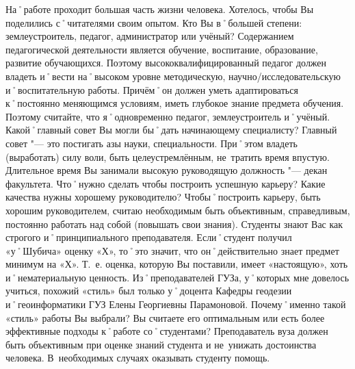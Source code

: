 \begin{drama}
	\maxspeaks На˚работе проходит большая часть жизни человека. Хотелось, чтобы Вы поделились с˚читателями своим опытом. Кто Вы в˚большей степени: землеустроитель, педагог, администратор или учёный?
	\michaelspeaks Содержанием педагогической деятельности является обучение, воспитание, образование, развитие обучающихся. Поэтому высококвалифицированный педагог должен владеть и˚вести на˚высоком уровне методическую, научно\-/исследовательскую и˚воспитательную работы. Причём˚он должен уметь адаптироваться к˚постоянно меняющимся условиям, иметь глубокое знание предмета обучения. Поэтому считайте, что я˚одновременно педагог, землеустроитель и˚учёный.
	\maxspeaks Какой˚главный совет Вы могли бы˚дать начинающему специалисту?
	\michaelspeaks Главный совет "--- это постигать азы науки, специальности. При˚этом владеть (выработать) силу воли, быть целеустремлённым, не~тратить время впустую.
	\maxspeaks Длительное время Вы занимали высокую руководящую должность "--- декан факультета. Что˚нужно сделать чтобы построить успешную карьеру? Какие качества нужны хорошему руководителю?
	\michaelspeaks Чтобы˚построить карьеру, быть хорошим руководителем, считаю необходимым быть объективным, справедливым, постоянно работать над собой (повышать свои знания).
	\maxspeaks Студенты знают Вас как строгого и˚принципиального преподавателя. Если˚студент получил  «у˚Шубича» оценку  «Х», то˚это значит, что он˚действительно знает предмет минимум на  «Х». Т.~е. оценка, которую Вы поставили, имеет  «настоящую», хоть и˚нематериальную ценность. Из˚преподавателей ГУЗа, у˚которых мне довелось учиться, похожий  «стиль» был только у˚доцента Кафедры геодезии и˚геоинформатики ГУЗ Елены Георгиевны Парамоновой. Почему˚именно такой  «стиль» работы Вы выбрали? Вы считаете его оптимальным или есть более эффективные подходы к˚работе со˚студентами?
	\michaelspeaks Преподаватель вуза должен быть объективным при оценке знаний студента и не~унижать достоинства человека. В~необходимых случаях оказывать студенту помощь.


\end{drama}
